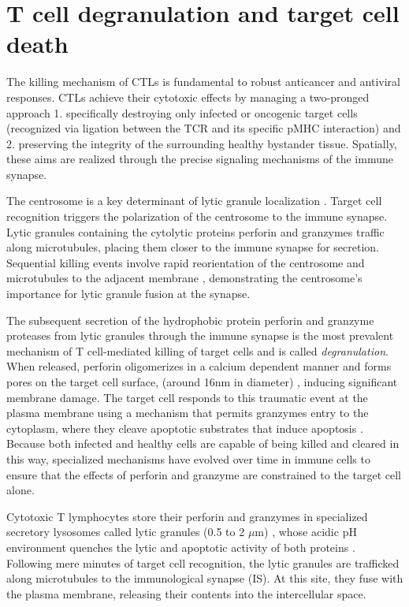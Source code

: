 \section{T cell degranulation and target cell death}
\label{T cell degranulation and target cell death}
The killing mechanism of CTLs is fundamental to robust anticancer and antiviral responses. CTLs achieve their cytotoxic effects by managing a two-pronged approach 1. specifically destroying only infected or oncogenic target cells (recognized via ligation between the TCR and its specific pMHC interaction) and 2. preserving the integrity of the surrounding healthy bystander tissue. Spatially, these aims are realized through the precise signaling mechanisms of the immune synapse.

The centrosome is a key determinant of lytic granule localization \cite{Stinchcombe2007, Huse2013}. Target cell recognition triggers the polarization of the centrosome to the immune synapse. Lytic granules containing the cytolytic proteins perforin and granzymes traffic along microtubules, placing them closer to the immune synapse for secretion. Sequential killing events involve rapid reorientation of the centrosome and microtubules to the adjacent membrane \cite{Kuhn2002}, demonstrating the centrosome's importance for lytic granule fusion at the synapse.

The subsequent secretion of the hydrophobic protein perforin and granzyme proteases from lytic granules through the immune synapse is the most prevalent mechanism of T cell-mediated killing of target cells \cite{Dustin2010, Stinchcombe2007} and is called \textit{degranulation}. When released, perforin oligomerizes in a calcium dependent manner \cite{Law2010} and forms pores on the target cell surface, (around 16nm in diameter) \cite{Cartwright2014}, inducing significant membrane damage. The target cell responds to this traumatic event at the plasma membrane using a mechanism that permits granzymes entry to the cytoplasm, where they cleave apoptotic substrates that induce apoptosis \cite{Keefe2005}. Because both infected and healthy cells are capable of being killed and cleared in this way, specialized mechanisms have evolved over time in immune cells to ensure that the effects of perforin and granzyme are constrained to the target cell alone.

Cytotoxic T lymphocytes store their perforin and granzymes in specialized secretory lysosomes called lytic granules (0.5 to 2 $\mu$m) \cite{Sanchez-Ruiz2011}, whose acidic pH environment quenches the lytic and apoptotic activity of both proteins \cite{Thiery2014, Keefe2005}. Following mere minutes of target cell recognition, the lytic granules are trafficked along microtubules to the immunological synapse (IS). At this site, they fuse with the plasma membrane, releasing their contents into the intercellular space.

